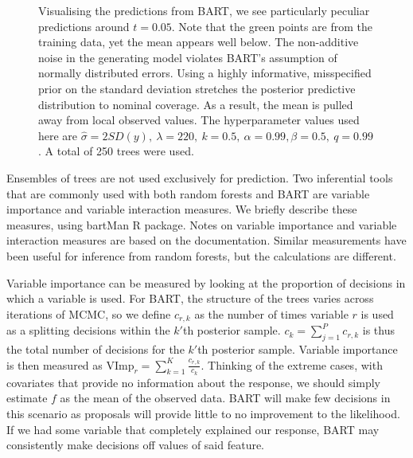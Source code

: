 \documentclass[
  12pt,
  letterpaper,
  DIV=11,
  numbers=noendperiod]{scrartcl}
\begin{document}
\begin{figure}[H]


\caption{\label{fig-bart-sim1}Visualising the predictions from BART, we
see particularly peculiar predictions around \(t=0.05\). Note that the
green points are from the training data, yet the mean appears well
below. The non-additive noise in the generating model violates BART's
assumption of normally distributed errors. Using a highly informative,
misspecified prior on the standard deviation stretches the posterior
predictive distribution to nominal coverage. As a result, the mean is
pulled away from local observed values. The hyperparameter values used
here are
\(\hat\sigma=2SD(y),\ \lambda=220,\ k=0.5,\ \alpha=0.99, \beta=0.5,\ q=0.99\).
A total of 250 trees were used.}

\end{figure}%

Ensembles of trees are not used exclusively for prediction. Two
inferential tools that are commonly used with both random forests and
BART are variable importance and variable interaction measures. We
briefly describe these measures, using \citep{bartMan} bartMan R
package. Notes on variable importance and variable interaction measures
are based on the documentation. Similar measurements have been useful
for inference from random forests, but the calculations are different.

Variable importance can be measured by looking at the proportion of
decisions in which a variable is used. For BART, the structure of the
trees varies across iterations of MCMC, so we define \(c_{r,k}\) as the
number of times variable \(r\) is used as a splitting decisions within
the \(k'\)th posterior sample. \(c_k=\sum_{j=1}^Pc_{r,k}\) is thus the
total number of decisions for the \(k'\)th posterior sample. Variable
importance is then measured as
\(\text{VImp}_r=\sum_{k=1}^K\frac{c_{r,k}}{c_k}\). Thinking of the
extreme cases, with covariates that provide no information about the
response, we should simply estimate \(f\) as the mean of the observed
data. BART will make few decisions in this scenario as proposals will
provide little to no improvement to the likelihood. If we had some
variable that completely explained our response, BART may consistently
make decisions off values of said feature.
\end{document}
